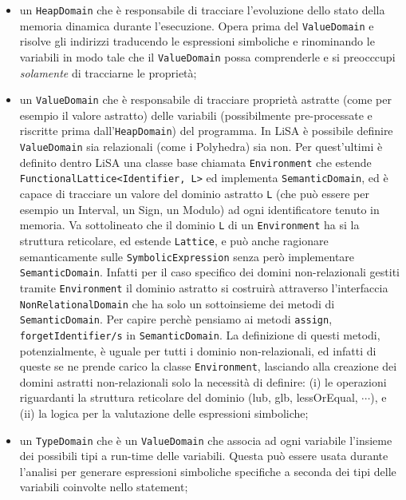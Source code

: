 \begin{itemize}
\setlength\itemsep{0.1em}
    \item un \texttt{HeapDomain} che è responsabile di tracciare l'evoluzione dello stato della memoria dinamica durante l'esecuzione. Opera prima del \texttt{ValueDomain} e risolve gli indirizzi traducendo le espressioni simboliche e rinominando le variabili in modo tale che il \texttt{ValueDomain} possa comprenderle e si preocccupi \textit{solamente} di tracciarne le proprietà;
    
    \item un \texttt{ValueDomain} che è responsabile di tracciare proprietà astratte (come per esempio il valore astratto) delle variabili (possibilmente pre-processate e riscritte prima dall'\texttt{HeapDomain}) del programma. In LiSA è possibile definire \texttt{ValueDomain} sia relazionali (come i Polyhedra) sia non. Per quest'ultimi è definito dentro LiSA una classe base chiamata \texttt{Environment} che estende  \texttt{FunctionalLattice<Identifier, L>} ed implementa \texttt{SemanticDomain}, ed è capace di tracciare un valore del dominio astratto \texttt{L} (che può essere per esempio un Interval, un Sign, un Modulo) ad ogni identificatore tenuto in memoria. Va sottolineato che il dominio \texttt{L} di un \texttt{Environment} ha si la struttura reticolare, ed estende \texttt{Lattice}, e può anche ragionare semanticamente sulle \texttt{SymbolicExpression} senza però implementare \texttt{SemanticDomain}. Infatti per il caso specifico dei domini non-relazionali gestiti tramite \texttt{Environment} il dominio astratto si costruirà attraverso l'interfaccia \texttt{NonRelationalDomain} che ha solo un sottoinsieme dei metodi di \texttt{SemanticDomain}. Per capire perchè pensiamo ai metodi \texttt{assign}, \texttt{forgetIdentifier/s} in \texttt{SemanticDomain}. La definizione di questi metodi, potenzialmente, è uguale per tutti i dominio non-relazionali, ed infatti di queste se ne prende carico la classe \texttt{Environment}, lasciando alla creazione dei domini astratti non-relazionali solo la necessità di definire: (i) le operazioni riguardanti la struttura reticolare del dominio (lub, glb, lessOrEqual, \(\cdots\)), e (ii) la logica per la valutazione delle espressioni simboliche;
    
    \item un \texttt{TypeDomain} che è un \texttt{ValueDomain} che associa ad ogni variabile l'insieme dei possibili tipi a run-time delle variabili. Questa può essere usata durante l'analisi per generare espressioni simboliche specifiche a seconda dei tipi delle variabili coinvolte nello statement;
\end{itemize}

